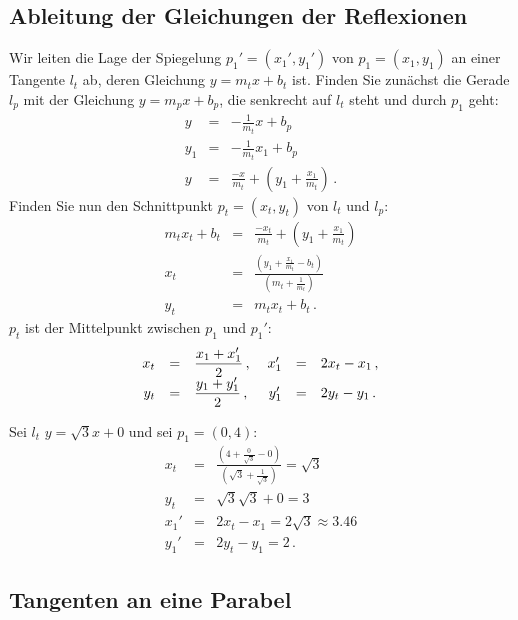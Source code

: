 
\subsection{Ableitung der Gleichungen der Reflexionen}

Wir leiten die Lage der Spiegelung $p_1'=(x_1',y_1')$ von $p_1=(x_1,y_1)$ an einer Tangente $l_t$ ab, deren Gleichung $y=m_tx+b_t$ ist. Finden Sie zunächst die Gerade $l_p$ mit der Gleichung $y=m_px+b_p$, die senkrecht auf $l_t$ steht und durch $p_1$ geht:
\begin{eqnarray*}
y&=&-\frac{1}{m_t}x+b_p\\
y_1&=&-\frac{1}{m_t}x_1+b_p\\
y&=&\frac{-x}{m_t}+\left(y_1+\frac{x_1}{m_t}\right)\,.
\end{eqnarray*}
Finden Sie nun den Schnittpunkt $p_t=(x_t,y_t)$ von $l_t$ und $l_p$:
\begin{eqnarray*}
m_tx_t+b_t&=&\frac{-x_t}{m_t}+\left(y_1+\frac{x_1}{m_t}\right)\\
x_t&=&\frac{\left(y_1+\displaystyle\frac{x_1}{m_t}-b_t\right)}{\left(m_t+\displaystyle\frac{1}{m_t}\right)}\\
y_t&=&m_tx_t+b_t\,.
\end{eqnarray*}
$p_t$ ist der Mittelpunkt zwischen $p_1$ und $p_1'$:
\[
\begin{array}{rcl@{\hspace{3ex}}rcl}
x_t&=&\displaystyle\frac{x_1+x_1'}{2}\,, &x_1'&=&2x_t-x_1\,,\\
y_t&=&\displaystyle\frac{y_1+y_1'}{2}\,,& y_1'&=&2y_t-y_1\,.
\end{array}
\]
\begin{example}
Sei $l_t$ $y=\sqrt{3}x+0$ und sei $p_1=(0,4)$:
\begin{eqnarray*}
x_t&=&\frac{\left(4+\displaystyle\frac{0}{\sqrt{3}}-0\right)}{\left(\sqrt{3}+\displaystyle\frac{1}{\sqrt{3}}\right)}=\sqrt{3}\\
y_t&=&\sqrt{3}\sqrt{3}+0=3\\
x_1'&=&2x_t-x_1=2\sqrt{3}\approx 3.46\\
y_1'&=&2y_t-y_1= 2\,.
\end{eqnarray*}
\end{example}


\subsection{Tangenten an eine Parabel}\label{s.parabola}

